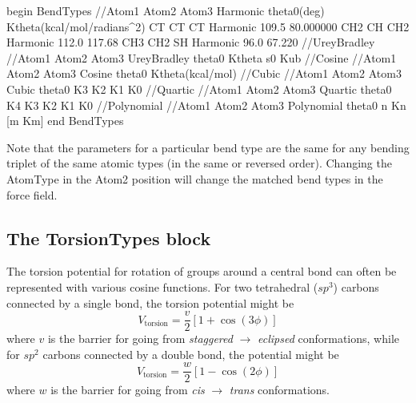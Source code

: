 \documentclass[]{book}
\begin{document}
\begin{code}[caption={[An example of a BendTypes block.] A
simple example of a BendTypes block.  By convention, equilibrium angles
($\theta_0$) are given in degrees but force constants are given in
units so that when multiplied by the correct power of angle (in
radians) they return energies in kcal/mol.  For example $k$ for a 
Harmonic bend is in units of kcal/mol/radians$^2$.},
label={sch:BendTypes}]
begin BendTypes
//Atom1 Atom2   Atom3   Harmonic      theta0(deg) Ktheta(kcal/mol/radians^2)
CT      CT      CT      Harmonic      109.5        80.000000
CH2     CH      CH2     Harmonic      112.0       117.68
CH3     CH2     SH      Harmonic       96.0        67.220
//UreyBradley
//Atom1 Atom2   Atom3   UreyBradley   theta0      Ktheta  s0  Kub
//Cosine
//Atom1 Atom2   Atom3   Cosine        theta0      Ktheta(kcal/mol)
//Cubic
//Atom1 Atom2   Atom3   Cubic         theta0      K3      K2  K1   K0
//Quartic
//Atom1 Atom2   Atom3   Quartic       theta0      K4      K3  K2   K1   K0
//Polynomial
//Atom1 Atom2   Atom3   Polynomial    theta0      n       Kn  [m   Km]
end BendTypes
\end{code}

Note that the parameters for a particular bend type are the same for
any bending triplet of the same atomic types (in the same or reversed
order).  Changing the AtomType in the Atom2 position will change the
matched bend types in the force field.

\subsection{\label{section:ffTorsion}The TorsionTypes block}
The torsion potential for rotation of groups around a central bond can
often be represented with various cosine functions.  For two
tetrahedral ($sp^3$) carbons connected by a single bond, the torsion
potential might be
\begin{equation*}
V_{\text{torsion}} = \frac{v}{2} \left[ 1 + \cos( 3 \phi ) \right]
\end{equation*}
where $v$ is the barrier for going from {\em staggered} $\rightarrow$
{\em eclipsed} conformations, while for $sp^2$ carbons connected by a
double bond, the potential might be
\begin{equation*}
V_{\text{torsion}} = \frac{w}{2} \left[ 1 - \cos( 2 \phi ) \right]
\end{equation*}
where $w$ is the barrier for going from  {\em cis} $\rightarrow$ {\em
  trans} conformations.
\end{document}
